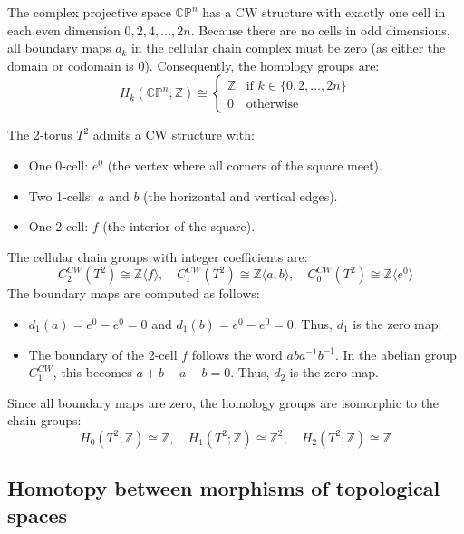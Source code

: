 \begin{example}
The complex projective space $\mathbb{CP}^n$ has a CW structure with exactly one cell in each even dimension $0, 2, 4, \dots, 2n$. 
Because there are no cells in odd dimensions, all boundary maps $d_k$ in the cellular chain complex must be zero (as either the domain or codomain is 0). 
Consequently, the homology groups are:
$$H_k(\mathbb{CP}^n; \mathbb{Z}) \cong 
\begin{cases} 
\mathbb{Z} & \text{if } k \in \{0, 2, \dots, 2n\} \\
0 & \text{otherwise}
\end{cases}$$
\end{example}

\begin{example}
The 2-torus $T^2$ admits a CW structure with:
\begin{itemize}
    \item One 0-cell: $e^0$ (the vertex where all corners of the square meet).
    \item Two 1-cells: $a$ and $b$ (the horizontal and vertical edges).
    \item One 2-cell: $f$ (the interior of the square).
\end{itemize}
The cellular chain groups with integer coefficients are:
$$C_2^{CW}(T^2) \cong \mathbb{Z} \langle f \rangle, \quad C_1^{CW}(T^2) \cong \mathbb{Z} \langle a, b \rangle, \quad C_0^{CW}(T^2) \cong \mathbb{Z} \langle e^0 \rangle$$
The boundary maps are computed as follows:
\begin{itemize}
    \item $d_1(a) = e^0 - e^0 = 0$ and $d_1(b) = e^0 - e^0 = 0$. Thus, $d_1$ is the zero map.
    \item The boundary of the 2-cell $f$ follows the word $aba^{-1}b^{-1}$. In the abelian group $C_1^{CW}$, this becomes $a + b - a - b = 0$. Thus, $d_2$ is the zero map.
\end{itemize}
Since all boundary maps are zero, the homology groups are isomorphic to the chain groups:
$$H_0(T^2; \mathbb{Z}) \cong \mathbb{Z}, \quad H_1(T^2; \mathbb{Z}) \cong \mathbb{Z}^2, \quad H_2(T^2; \mathbb{Z}) \cong \mathbb{Z}$$
\end{example}



\subsection{Homotopy between morphisms of topological spaces}



